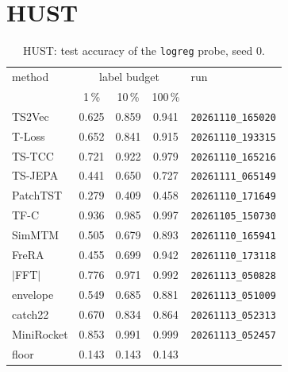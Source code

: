 \section{HUST}
\begin{table}[h]
\centering
\begin{tabular}{lcccl}
\toprule
method & \multicolumn{3}{c}{label budget} & run \\
 & 1\,\% & 10\,\% & 100\,\% & \\
\midrule
TS2Vec & 0.625 & 0.859 & 0.941 & \texttt{\footnotesize 20261110\_165020} \\
T-Loss & 0.652 & 0.841 & 0.915 & \texttt{\footnotesize 20261110\_193315} \\
TS-TCC & 0.721 & 0.922 & 0.979 & \texttt{\footnotesize 20261110\_165216} \\
TS-JEPA & 0.441 & 0.650 & 0.727 & \texttt{\footnotesize 20261111\_065149} \\
PatchTST & 0.279 & 0.409 & 0.458 & \texttt{\footnotesize 20261110\_171649} \\
TF-C & 0.936 & 0.985 & 0.997 & \texttt{\footnotesize 20261105\_150730} \\
SimMTM & 0.505 & 0.679 & 0.893 & \texttt{\footnotesize 20261110\_165941} \\
FreRA & 0.455 & 0.699 & 0.942 & \texttt{\footnotesize 20261110\_173118} \\
\midrule
$|$FFT$|$ & 0.776 & 0.971 & 0.992 & \texttt{\footnotesize 20261113\_050828} \\
envelope & 0.549 & 0.685 & 0.881 & \texttt{\footnotesize 20261113\_051009} \\
catch22 & 0.670 & 0.834 & 0.864 & \texttt{\footnotesize 20261113\_052313} \\
MiniRocket & 0.853 & 0.991 & 0.999 & \texttt{\footnotesize 20261113\_052457} \\
\midrule
floor & 0.143 & 0.143 & 0.143 & \\
\bottomrule
\end{tabular}
\caption{HUST: test accuracy of the \texttt{logreg} probe, seed 0.}
\end{table}

